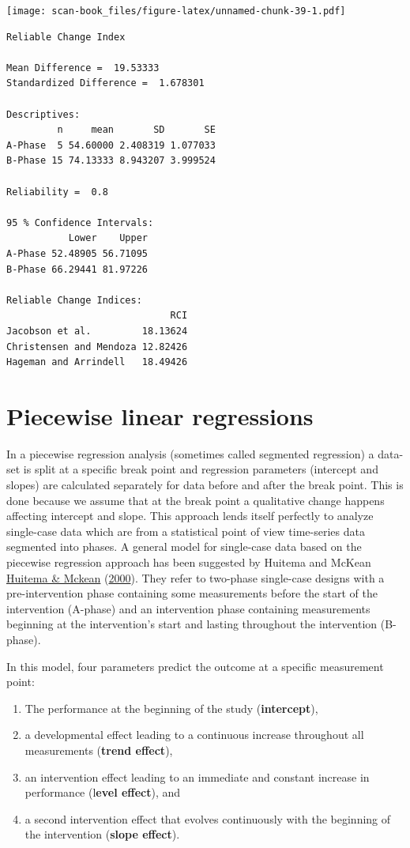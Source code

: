 \documentclass[
]{book}
\begin{document}
\texttt{[image: scan-book\_files/figure-latex/unnamed-chunk-39-1.pdf]}

\begin{verbatim}
Reliable Change Index

Mean Difference =  19.53333 
Standardized Difference =  1.678301 

Descriptives:
         n     mean       SD       SE
A-Phase  5 54.60000 2.408319 1.077033
B-Phase 15 74.13333 8.943207 3.999524

Reliability =  0.8 

95 % Confidence Intervals:
           Lower    Upper
A-Phase 52.48905 56.71095
B-Phase 66.29441 81.97226

Reliable Change Indices:
                             RCI
Jacobson et al.         18.13624
Christensen and Mendoza 12.82426
Hageman and Arrindell   18.49426
\end{verbatim}

\hypertarget{piecewise-linear-regressions}{%
\chapter{Piecewise linear regressions}\label{piecewise-linear-regressions}}

In a piecewise regression analysis (sometimes called segmented regression) a data-set is split at a specific break point and regression parameters (intercept and slopes) are calculated separately for data before and after the break point. This is done because we assume that at the break point a qualitative change happens affecting intercept and slope. This approach lends itself perfectly to analyze single-case data which are from a statistical point of view time-series data segmented into phases. A general model for single-case data based on the piecewise regression approach has been suggested by Huitema and McKean \protect\hyperlink{ref-huitema_design_2000}{Huitema \& Mckean} (\protect\hyperlink{ref-huitema_design_2000}{2000}). They refer to two-phase single-case designs with a pre-intervention phase containing some measurements before the start of the intervention (A-phase) and an intervention phase containing measurements beginning at the intervention's start and lasting throughout the intervention (B-phase).

In this model, four parameters predict the outcome at a specific measurement point:

\begin{enumerate}
\def\labelenumi{\arabic{enumi}.}
\item
  The performance at the beginning of the study (\textbf{intercept}),
\item
  a developmental effect leading to a continuous increase throughout all measurements (\textbf{trend effect}),
\item
  an intervention effect leading to an immediate and constant increase in performance (l\textbf{evel effect}), and
\item
  a second intervention effect that evolves continuously with the beginning of the intervention (\textbf{slope effect}).
\end{enumerate}
\end{document}
